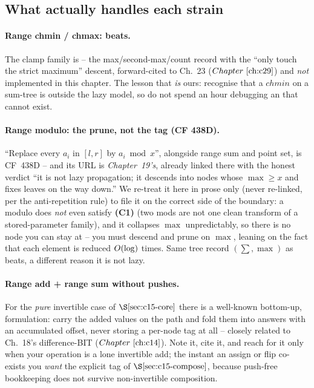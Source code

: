 \subsection{What actually handles each strain}

\paragraph{Range chmin / chmax: beats.}
The clamp family is  -- the max/second-max/count record with the ``only touch the strict maximum'' descent, forward-cited to Ch.~23 (\(\chref{c29}\)) and \emph{not} implemented in this chapter.  The lesson that \emph{is} ours: recognise that a \(\mathit{chmin}\) on a sum-tree is outside the lazy model, so do not spend an hour debugging an  that cannot exist.

\paragraph{Range modulo: the prune, not the tag (CF 438D).}
``Replace every \(a_i\) in \([l,r]\) by \(a_i\bmod x\)'', alongside range sum and point set, is CF~438D -- and its URL is \emph{Chapter~19's}, already linked there with the honest verdict ``it is not lazy propagation; it descends into nodes whose \(\max\ge x\) and fixes leaves on the way down.''  We re-treat it here in prose only (never re-linked, per the anti-repetition rule) to file it on the correct side of the boundary: a modulo does \emph{not} even satisfy \textbf{(C1)} (two mods are not one clean transform of a stored-parameter family), and it collapses \(\max\) unpredictably, so there is no node you can stay at -- you must descend and prune on \(\max\), leaning on the fact that each element is reduced \(O(\log)\) times.  Same tree record \((\sum,\max)\) as beats, a different reason it is not lazy.

\paragraph{Range add + range sum without pushes.}
For the \emph{pure} invertible case of \(\secref{c15-core}\) there is a well-known bottom-up,  formulation: carry the added values on the path and fold them into answers with an accumulated offset, never storing a per-node tag at all -- closely related to Ch.~18's difference-BIT (\(\chref{c14}\)).  Note it, cite it, and reach for it only when your operation is a lone invertible add; the instant an assign or flip co-exists you \emph{want} the explicit tag of \(\secref{c15-compose}\), because push-free bookkeeping does not survive non-invertible composition.

